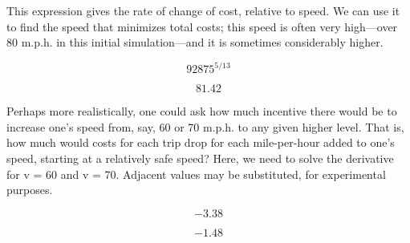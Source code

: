 \documentclass{article}
\begin{document}
\begin{maplegroup}
This expression gives the rate of change of cost, relative to speed.
We can use it to find the speed that minimizes total costs; this speed
is often very high---over 80 m.p.h. in this initial simulation---and
it is sometimes considerably higher.

\begin{mapleinput}
\end{mapleinput}

\mapleresult
\begin{maplelatex}
\[
92875^{5/13}
\]
\end{maplelatex}

\begin{maplelatex}
\[
81.42
\]
\end{maplelatex}

\end{maplegroup}
\begin{maplegroup}
Perhaps more realistically, one could ask how much incentive there
would be to increase one's speed from, say, 60 or 70 m.p.h. to any
given higher level. That is, how much would costs for each trip drop
for each mile-per-hour added to one's speed, starting at a relatively
safe speed? Here, we need to solve the derivative for v = 60 and v =
70. Adjacent values may be substituted, for experimental purposes.

\begin{mapleinput}
\end{mapleinput}

\end{maplegroup}
\begin{maplegroup}
\begin{mapleinput}
\end{mapleinput}

\mapleresult
\begin{maplelatex}
\[
-3.38
\]
\end{maplelatex}

\begin{maplelatex}
\[
-1.48
\]
\end{maplelatex}

\end{maplegroup}
\end{document}
